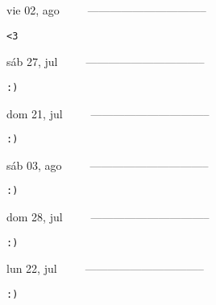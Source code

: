 \documentclass[letterpaper,10pt]{article}
\begin{document}
\begin{multicols}{3}
{vie 02, ago\ \ \ \ \ --------------------------------}
\begin{flushright}\begin{small}\texttt{<3}\end{small}\end{flushright}
\vfill
{sáb 27, jul\ \ \ \ \ --------------------------------}
\begin{flushright}\begin{small}\texttt{:)}\end{small}\end{flushright}\par
\vfill
{dom 21, jul\ \ \ \ \ --------------------------------}
\begin{flushright}\begin{small}\texttt{:)}\end{small}\end{flushright}\par
\vfill
\end{multicols}
\vspace{1.05cm}

\begin{multicols}{3}
{sáb 03, ago\ \ \ \ \ --------------------------------}
\begin{flushright}\begin{small}\texttt{:)}\end{small}\end{flushright}
\vfill
{dom 28, jul\ \ \ \ \ --------------------------------}
\begin{flushright}\begin{small}\texttt{:)}\end{small}\end{flushright}\par
\vfill
{lun 22, jul\ \ \ \ \ --------------------------------}
\begin{flushright}\begin{small}\texttt{:)}\end{small}\end{flushright}\par
\vfill
\end{multicols}
\vspace{1.05cm}
\end{document}
